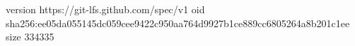 version https://git-lfs.github.com/spec/v1
oid sha256:ee05da055145dc059cee9422c950aa764d9927b1ce889cc6805264a8b201c1ee
size 334335
